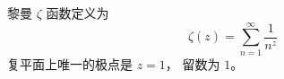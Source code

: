 
\begin{issues}
\issueDraft
\end{issues}


黎曼 $\zeta$ 函数定义为
\begin{equation}
\zeta(z) = \sum_{n=1}^\infty \frac{1}{n^z}
\end{equation}
复平面上唯一的极点是 $z = 1$， 留数为 $1$。
